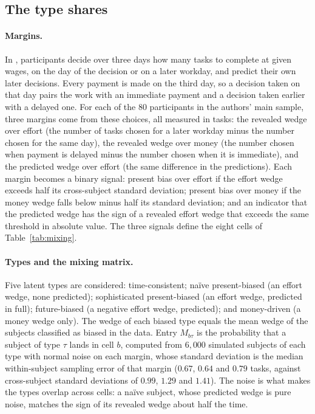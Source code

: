 \documentclass[11pt,a4paper]{article}
\theoremstyle{plain}
\theoremstyle{definition}
\begin{document}
\subsection{The type shares}
\label{app:types}

\paragraph{Margins.} In \citet{cerrone2026}, participants decide over three days how many tasks to complete at given
wages, on the day of the decision or on a later workday, and predict their own later decisions. Every payment is made
on the third day, so a decision taken on that day pairs the work with an immediate payment and a decision taken
earlier with a delayed one. For each of the $80$ participants in the authors' main sample, three margins come from
these choices, all measured in tasks: the revealed wedge over effort (the number of tasks chosen for a later workday
minus the number chosen for the same day), the revealed wedge over money (the number chosen when payment is delayed
minus the number chosen when it is immediate), and the predicted wedge over effort (the same difference in the
predictions). Each margin becomes a binary signal: present bias over effort if the effort
wedge exceeds half its cross-subject standard deviation; present bias over money if the money wedge falls below minus
half its standard deviation; and an indicator that the predicted wedge has the sign of a revealed effort wedge that
exceeds the same threshold in absolute value. The three signals define the eight cells of Table~\ref{tab:mixing}.

\paragraph{Types and the mixing matrix.} Five latent types are considered: time-consistent; na\"ive present-biased (an
effort wedge, none predicted); sophisticated present-biased (an effort wedge, predicted in full); future-biased (a
negative effort wedge, predicted); and money-driven (a money wedge only). The wedge of each biased type equals the mean
wedge of the subjects classified as biased in the data. Entry $M_{b\tau}$ is the probability that a subject of type
$\tau$ lands in cell $b$, computed from $6{,}000$ simulated subjects of each type with normal noise on each margin,
whose standard deviation is the median within-subject sampling error of that margin ($0.67$, $0.64$ and $0.79$ tasks,
against cross-subject standard deviations of $0.99$, $1.29$ and $1.41$). The noise is what makes the types overlap
across cells: a na\"ive subject, whose predicted wedge is pure noise, matches the sign of its revealed wedge about half
the time.
\end{document}
